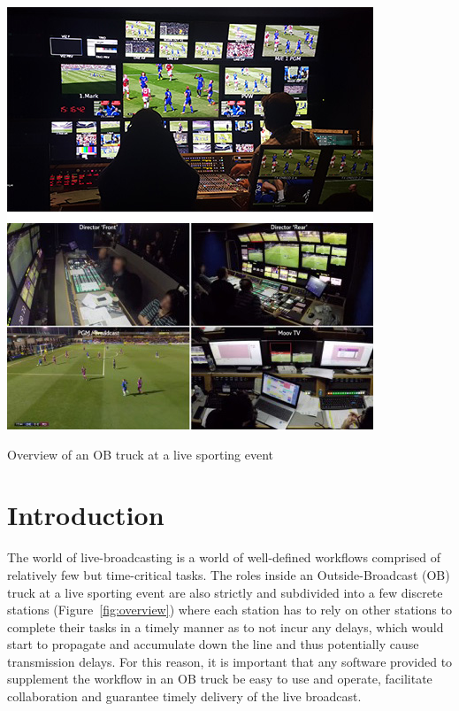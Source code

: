 \documentclass[sigchi-a, authorversion]{acmart}
\begin{document}
\begin{marginfigure}
    \vspace{12pc}
    \includegraphics[width=\marginparwidth]{Figures/overview.jpg}
    \caption{Overview of an OB truck at a live sporting event}
    \label{fig:overview}
\end{marginfigure}


\maketitle

\section{Introduction}

 The world of live-broadcasting is a world of well-defined workflows comprised
 of relatively few but time-critical tasks. The roles inside an Outside-Broadcast (OB)
 truck at a live sporting event are also strictly and subdivided into a few
 discrete stations (Figure~\ref{fig:overview}) where each station has to rely on other stations to complete
 their tasks in a timely manner as to not incur any delays, which would start
 to propagate and accumulate down the line and thus potentially cause
 transmission delays. For this reason, it is important that any software
 provided to supplement the workflow in an OB truck be easy to use and operate,
 facilitate collaboration and guarantee timely delivery of the live broadcast.
\end{document}
